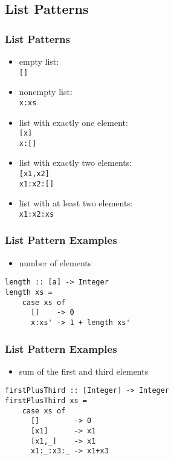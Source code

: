 \documentclass[dvipsnames]{beamer}
\theoremstyle{plain}
\begin{document}
\subsection{List Patterns}

\begin{frame}[fragile]
  \frametitle{List Patterns}

  \begin{itemize}
    \item empty list:\\
      \lstinline{[]}
    \item nonempty list:\\
      \lstinline{x:xs}
    \item list with exactly one element:\\
      \lstinline{[x]}\\
      \lstinline{x:[]}
    \item list with exactly two elements:\\
      \lstinline{[x1,x2]}\\
      \lstinline{x1:x2:[]}
    \item list with at least two elements:\\
      \lstinline{x1:x2:xs}
  \end{itemize}
\end{frame}

\begin{frame}[fragile]
  \frametitle{List Pattern Examples}

  \begin{itemize}
    \item number of elements
  \end{itemize}

  \begin{lstlisting}
length :: [a] -> Integer
length xs =
    case xs of
      []    -> 0
      x:xs' -> 1 + length xs'
  \end{lstlisting}
\end{frame}

\begin{frame}[fragile]
  \frametitle{List Pattern Examples}

  \begin{itemize}
    \item sum of the first and third elements
  \end{itemize}

  \begin{lstlisting}
firstPlusThird :: [Integer] -> Integer
firstPlusThird xs =
    case xs of
      []        -> 0
      [x1]      -> x1
      [x1,_]    -> x1
      x1:_:x3:_ -> x1+x3
  \end{lstlisting}
\end{frame}
\end{document}
